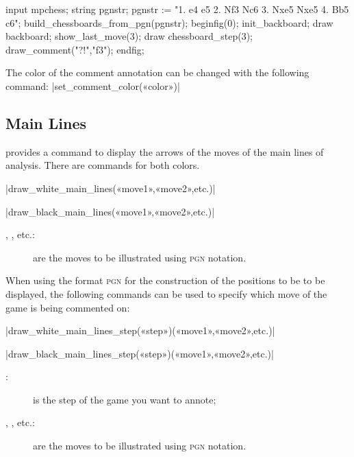 \documentclass[english]{ltxdoc}
\begin{document}
\begin{ExempleMP}
input mpchess;
string pgnstr;
pgnstr := "1. e4 e5 2. Nf3 Nc6 3. Nxe5 Nxe5 4. Bb5 c6";
build_chessboards_from_pgn(pgnstr);
beginfig(0);
init_backboard;
draw backboard;
show_last_move(3);
draw chessboard_step(3); %
draw_comment("?!","f3");
endfig;
\end{ExempleMP}

The color of the comment annotation can be changed with the following command:
\commande|set_comment_color(«color»)|\smallskip


\subsection{Main Lines}

\mpchess provides a command to display the arrows of the moves of the
main lines of analysis. There are commands for both colors. 

\commande|draw_white_main_lines(«move1»,«move2»,etc.)|\smallskip

\commande|draw_black_main_lines(«move1»,«move2»,etc.)|\smallskip

\begin{description}
  \item[, , etc.:] are the moves to be illustrated using
\textsc{pgn} notation.
\end{description}
  
When using the format \textsc{pgn} for the construction of the positions to be  
to be displayed, the following commands can be used  
to specify which move of the game is being commented on:

\commande|draw_white_main_lines_step(«step»)(«move1»,«move2»,etc.)|\smallskip

\commande|draw_black_main_lines_step(«step»)(«move1»,«move2»,etc.)|\smallskip

\begin{description}
\item[:] is the step of the game you want to annote; 
\item[, , etc.:] are the moves to be illustrated using
\textsc{pgn} notation.
\end{description}
\end{document}
